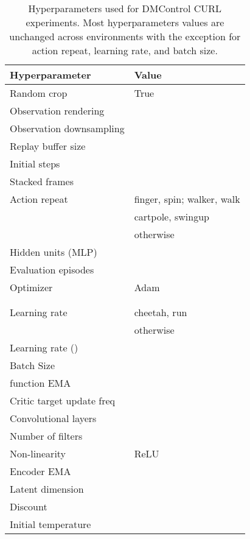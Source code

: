 \documentclass{article}
\begin{document}
\begin{table}[h]
\caption{Hyperparameters used for DMControl CURL experiments. Most hyperparameters values are unchanged across environments with the exception for action repeat, learning rate, and batch size.}

\label{table:hyperparameters}
\vskip 0.15in
\begin{center}
\begin{small}
\begin{tabular}{ll}
\toprule
\textbf{Hyperparameter} & \textbf{Value}  \\
\midrule
Random crop    & True  \\ 
Observation rendering    &   \\ 
Observation downsampling    &   \\ 
Replay buffer size    &  \\ 
Initial steps    &   \\ 
Stacked frames    &   \\ 
Action repeat    &  finger, spin; walker, walk\\
 &  cartpole, swingup \\
 &  otherwise  \\
Hidden units (MLP)    &   \\ 
Evaluation episodes    &   \\ 
Optimizer    & Adam  \\ 
   &   \\
   &   \\
Learning rate      &  cheetah, run \\
&  otherwise\\ 
Learning rate () &  \\

Batch Size    &   \\ 
 function EMA  &  \\
Critic target update freq &  \\
Convolutional layers &  \\
Number of filters &  \\
Non-linearity & ReLU \\
Encoder EMA  &  \\
Latent dimension &  \\
Discount  &  \\
Initial temperature &  \\


\bottomrule
\end{tabular}
\end{small}
\end{center}
\vskip -0.1in
\end{table}
\end{document}
